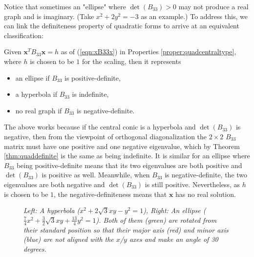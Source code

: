 Notice that sometimes an "ellipse" where $\det(B_{33}) > 0$ may not produce a real graph and is imaginary. (Take $x^2 + 2y^2 = -3$ as an example.) To address this, we can link the definiteness property of quadratic forms to arrive at an equivalent classification:
\begin{thm}
\label{thm:quadcentraltypealt}
Given $\textbf{x}^TB_{33}\textbf{x} = h$ as of (\ref{eqn:xB33x}) in Properties \ref{proper:quadcentraltype}, where $h$ is chosen to be $1$ for the scaling, then it represents
\begin{itemize}
\item an ellipse if $B_{33}$ is positive-definite,
\item a hyperbola if $B_{33}$ is indefinite,
\item no real graph if $B_{33}$ is negative-definite.
\end{itemize}
\end{thm}
The above works because if the central conic is a hyperbola and $\det(B_{33})$ is negative, then from the viewpoint of orthogonal diagonalization the $2 \times 2$ $B_{33}$ matrix must have one positive and one negative eigenvalue, which by Theorem \ref{thm:quaddefinite} is the same as being indefinite. It is similar for an ellipse where $B_{33}$ being positive-definite means that its two eigenvalues are both positive and $\det(B_{33})$ is positive as well. Meanwhile, when $B_{33}$ is negative-definite, the two eigenvalues are both negative and $\det(B_{33})$ is still positive. Nevertheless, as $h$ is chosen to be $1$, the negative-definiteness means that $\textbf{x}$ has no real solution.
\begin{figure}[ht!]
\centering
{}
\caption{\textit{Left: A hyperbola ($x^2 + 2\sqrt{3}xy - y^2 = 1$), Right: An ellipse ($\frac{7}{4}x^2 + \frac{3}{2}\sqrt{3}xy + \frac{13}{4}y^2 = 1$). Both of them (green) are rotated from their standard position so that their major axis (red) and minor axis (blue) are not aligned with the $x$/$y$ axes and make an angle of 30 degrees.}}
\label{fig:hyperellip}
\end{figure}

